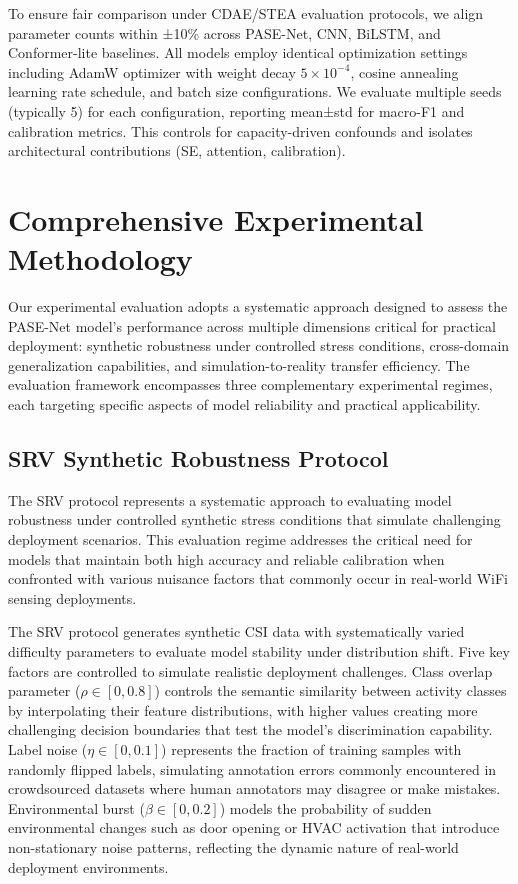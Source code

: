 \documentclass[journal]{IEEEtran}
\begin{document}
To ensure fair comparison under CDAE/STEA evaluation protocols, we align parameter counts within ±10\% across PASE-Net, CNN, BiLSTM, and Conformer-lite baselines. All models employ identical optimization settings including AdamW optimizer with weight decay $5 \times 10^{-4}$, cosine annealing learning rate schedule, and batch size configurations. We evaluate multiple seeds (typically 5) for each configuration, reporting mean±std for macro-F1 and calibration metrics. This controls for capacity-driven confounds and isolates architectural contributions (SE, attention, calibration).

\section{Comprehensive Experimental Methodology}

Our experimental evaluation adopts a systematic approach designed to assess the PASE-Net model's performance across multiple dimensions critical for practical deployment: synthetic robustness under controlled stress conditions, cross-domain generalization capabilities, and simulation-to-reality transfer efficiency. The evaluation framework encompasses three complementary experimental regimes, each targeting specific aspects of model reliability and practical applicability.

\subsection{SRV Synthetic Robustness Protocol}

The SRV protocol represents a systematic approach to evaluating model robustness under controlled synthetic stress conditions that simulate challenging deployment scenarios. This evaluation regime addresses the critical need for models that maintain both high accuracy and reliable calibration when confronted with various nuisance factors that commonly occur in real-world WiFi sensing deployments.

The SRV protocol generates synthetic CSI data with systematically varied difficulty parameters to evaluate model stability under distribution shift. Five key factors are controlled to simulate realistic deployment challenges. Class overlap parameter ($\rho \in [0, 0.8]$) controls the semantic similarity between activity classes by interpolating their feature distributions, with higher values creating more challenging decision boundaries that test the model's discrimination capability. Label noise ($\eta \in [0, 0.1]$) represents the fraction of training samples with randomly flipped labels, simulating annotation errors commonly encountered in crowdsourced datasets where human annotators may disagree or make mistakes. Environmental burst ($\beta \in [0, 0.2]$) models the probability of sudden environmental changes such as door opening or HVAC activation that introduce non-stationary noise patterns, reflecting the dynamic nature of real-world deployment environments.
\end{document}
